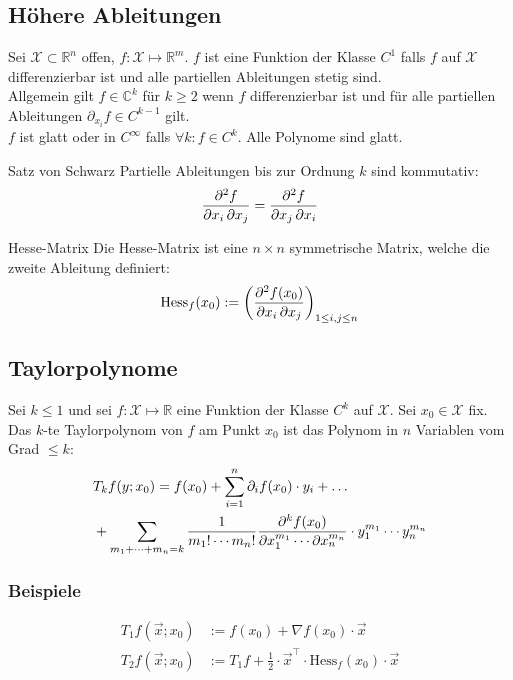 \documentclass[a4paper,10pt]{article}
\def\R{\mathbb{R}}
\def\C{\mathbb{C}}
\def\X{\mathcal{X}}
\begin{document}
\subsection{Höhere Ableitungen}
Sei \(\X \subset \R^n\) offen, \(f: \X \mapsto \R^m\). \(f\) ist eine Funktion der Klasse \(C^1\) falls \(f\) auf \(\X\) differenzierbar ist und alle partiellen Ableitungen stetig sind. \\
Allgemein gilt \(f \in \C^k\) für \(k \ge 2\) wenn \(f\) differenzierbar ist und für alle partiellen Ableitungen \(\partial_{x_i} f \in C^{k-1}\) gilt. \\
\(f\) ist glatt oder in \(C^\infty\) falls \(\forall k: f \in C^k \). Alle Polynome sind glatt.
\begin{subbox}{Satz von Schwarz}
  Partielle Ableitungen bis zur Ordnung \(k\) sind kommutativ:
  \[\pdv{f}{x_i, x_j} = \pdv{f}{ x_j, x_i}\]
\end{subbox}
\begin{mainbox}{Hesse-Matrix}
  Die Hesse-Matrix ist eine \(n \times n\) symmetrische Matrix, welche die zweite Ableitung definiert:
  \[\text{Hess}_f(x_0) := \left(\pdv{f(x_0)}{x_i, x_j}\right)_{1\le i,j \le n}\] 
\end{mainbox}
\subsection{Taylorpolynome}
Sei \(k \le 1\) und sei \(f: \X \mapsto \R\) eine Funktion der Klasse \(C^k\) auf \(\X\). Sei \(x_0 \in \X\) fix. Das \(k\)-te Taylorpolynom von \(f\) am Punkt \(x_0\) ist das Polynom in \(n\) Variablen vom Grad \(\le k\):
\begin{align*}
  &T_k f(y; x_0) = f(x_0) + \sum_{i=1}^n \partial_i f(x_0) \cdot y_i + \dots \\
  &+ \sum_{m_1 + \cdots + m_n = k} \frac{1}{m_1! \cdots m_n!} \pdv{^k f(x_0) }{x_1^{m_1} \cdots \partial x_n^{m_n}} \cdot y_1^{m_1} \cdots y_n^{m_n}
\end{align*}

\subsubsection*{Beispiele}
\begin{align*}
  T_1 f(\vec{x}; x_0) &:= f(x_0) + \nabla f(x_0) \cdot \vec{x} \\
  T_2 f(\vec{x}; x_0) &:= T_1f + \frac{1}{2} \cdot \vec{x}^\top \cdot \text{Hess}_f(x_0) \cdot \vec{x}
\end{align*}
\end{document}
